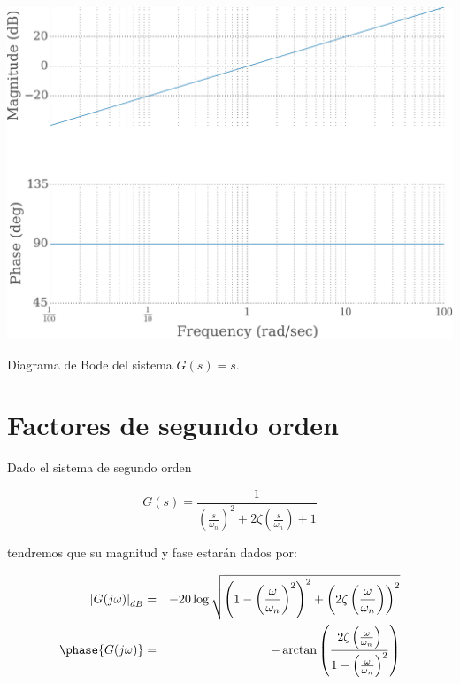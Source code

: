             \begin{marginfigure}
                \centering
                \includegraphics[width=\textwidth]{./imagenes/bodederivativo.pdf}
                \caption{\label{fig:bodederivativo}Diagrama de Bode del sistema $G(s) = s$.}
            \end{marginfigure}


    \newpage
    \section{Factores de segundo orden}

        Dado el sistema de segundo orden

        \begin{equation*}
            G(s) = \frac{1}{\left( \frac{s}{\omega_n} \right)^2 + 2 \zeta \left( \frac{s}{\omega_n} \right) + 1}
        \end{equation*}

        tendremos que su magnitud y fase estarán dados por:

        \begin{eqnarray*}
            \left| G(j \omega) \right|_{dB} & = & -20 \log{\sqrt{\left( 1 - \left( \frac{\omega}{\omega_n} \right)^2 \right)^2 + \left( 2 \zeta \left( \frac{\omega}{\omega_n} \right) \right)^2}} \\
            \phase{G(j \omega)} & = & -\arctan{\left( \frac{2 \zeta \left( \frac{\omega}{\omega_n} \right)}{1 - \left( \frac{\omega}{\omega_n} \right)^2} \right)}
        \end{eqnarray*}

